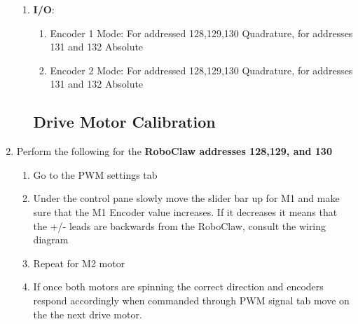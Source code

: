\documentclass[12pt]{article}
\begin{document}
\begin{enumerate}
\begin{enumerate}
		\item \textbf{I/O}:
		\begin{enumerate}
			\item Encoder 1 Mode: For addressed 128,129,130 Quadrature, for addresses 131 and 132 Absolute
			\item Encoder 2 Mode: For addressed 128,129,130 Quadrature, for addresses 131 and 132 Absolute
		\end{enumerate}
\subsection{Drive Motor Calibration}
	\end{enumerate}
	\item Perform the following for the \textbf{RoboClaw addresses 128,129, and 130}
	\begin{enumerate}
		\item Go to the PWM settings tab
		\item Under the control pane slowly move the slider bar up for M1 and make sure that the M1 Encoder value increases. If it decreases it means that the +/- leads are backwards from the RoboClaw, consult the wiring diagram
		\item Repeat for M2 motor 
		\item If once both motors are spinning the correct direction and encoders respond accordingly when commanded through PWM signal tab move on the the next drive motor. 
	\end{enumerate}
	

\end{enumerate}
\end{document}
